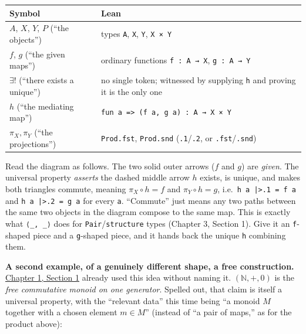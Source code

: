 \begin{center}

\end{center}

\begin{longtable}[]{@{}
  >{\raggedright\arraybackslash}p{}
  >{\raggedright\arraybackslash}p{}@{}}
\toprule\noalign{}
\begin{minipage}[b]{\linewidth}\raggedright
Symbol
\end{minipage} & \begin{minipage}[b]{\linewidth}\raggedright
Lean
\end{minipage} \\
\midrule\noalign{}
\endhead
\bottomrule\noalign{}
\endlastfoot
\(A\), \(X\), \(Y\), \(P\) (``the objects'') & types \texttt{A}, \texttt{X}, \texttt{Y}, \texttt{X × Y} \\
\(f\), \(g\) (``the given maps'') & ordinary functions \texttt{f : A → X}, \texttt{g : A → Y} \\
\(\exists!\) (``there exists a unique'') & no single token; witnessed by supplying \texttt{h} and proving it is the only one \\
\(h\) (``the mediating map'') & \texttt{fun a => (f a, g a) : A → X × Y} \\
\(\pi_X, \pi_Y\) (``the projections'') & \texttt{Prod.fst}, \texttt{Prod.snd} (\texttt{.1}/\texttt{.2}, or \texttt{.fst}/\texttt{.snd}) \\
\end{longtable}

Read the diagram as follows. The two solid outer arrows (\(f\) and \(g\)) are \emph{given}. The universal property \emph{asserts} the dashed middle arrow \(h\) exists, is unique, and makes both triangles commute, meaning \(\pi_X \circ h = f\) and \(\pi_Y \circ h = g\), i.e.~\texttt{h a |>.1 = f a} and \texttt{h a |>.2 = g a} for every \texttt{a}. ``Commute'' just means any two paths between the same two objects in the diagram compose to the same map. This is exactly what \texttt{⟨\_\allowbreak{}, \_\allowbreak{}⟩} does for \texttt{Pair}/\texttt{structure} types (Chapter 3, Section 1). Give it an \texttt{f}-shaped piece and a \texttt{g}-shaped piece, and it hands back the unique \texttt{h} combining them.

\textbf{A second example, of a genuinely different shape, a free construction.} \hyperref[sec:01-basics:01-everything-has-a-type:1]{Chapter 1, Section 1} already used this idea without naming it. \((\mathbb{N}, +, 0)\) is the \emph{free commutative monoid on one generator}. Spelled out, that claim is itself a universal property, with the ``relevant data'' this time being ``a monoid \(M\) together with a chosen element \(m \in M\)'' (instead of ``a pair of maps,'' as for the product above):


